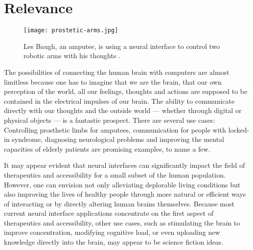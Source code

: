 

\section{Relevance}
\label{chapter1-relevance}

\begin{figure}
  \centering
  \texttt{[image: prostetic-arms.jpg]}
  \caption{Les Baugh, an amputee, is using a neural interface to control two robotic arms with his thoughts \citep{campbell_amputee_2014}.}
  \label{fig:prostetic-arms}
\end{figure}

The possibilities of connecting the human brain with computers are almost limitless because one has to imagine that we are the brain, that our own perception of the world, all our feelings, thoughts and actions are supposed to be contained in the electrical impulses of our brain. The ability to communicate directly with our thoughts and the outside world — whether through digital or physical objects — is a fantastic prospect. There are several use cases: Controlling prosthetic limbs for amputees, communication for people with locked-in syndrome, diagnosing neurological problems and improving the mental capacities of elderly patients are promising examples, to name a few.

It may appear evident that neural interfaces can significantly impact the field of therapeutics and accessibility for a small subset of the human population. However, one can envision not only alleviating deplorable living conditions but also improving the lives of healthy people through more natural or efficient ways of interacting or by directly altering human brains themselves. Because most current neural interface applications concentrate on the first aspect of therapeutics and accessibility, other use cases, such as stimulating the brain to improve concentration, modifying cognitive load, or even uploading new knowledge directly into the brain, may appear to be science fiction ideas.


